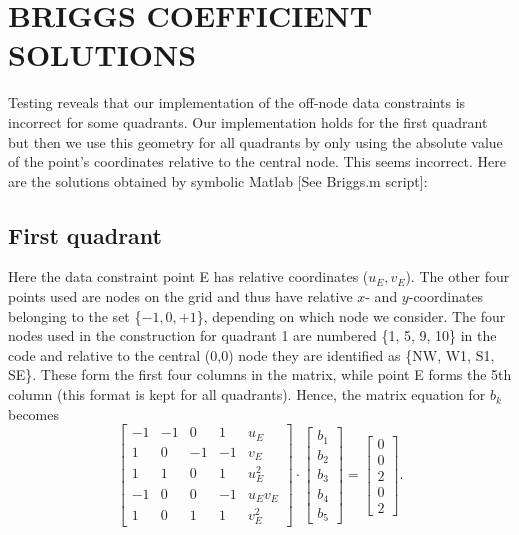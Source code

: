 \documentclass[12pt,letterpaper,margin=0.5in]{article}
\begin{document}
\section{BRIGGS COEFFICIENT SOLUTIONS}

Testing reveals that our implementation of the off-node data constraints is incorrect
for some quadrants.  Our implementation holds for the first quadrant but then we
use this geometry for all quadrants by only using the absolute value of the point's
coordinates relative to the central node.  This seems incorrect.  Here are the
solutions obtained by symbolic Matlab [See Briggs.m script]:
\subsection{First quadrant}
Here the data constraint point E has relative coordinates ($u_E, v_E$).  The other four points used are
nodes on the grid and thus have relative $x$- and $y$-coordinates belonging to the set \{$-1, 0, +1$\}, depending on
which node we consider. The four nodes used in the
construction for quadrant 1 are numbered \{1, 5, 9, 10\} in the code and relative to the central (0,0) node they
are identified as \{NW, W1, S1, SE\}. These form the first four columns in the matrix, while point E
forms the 5th column (this format is kept for all quadrants).  Hence, the matrix equation
for $b_k$ becomes
\begin{equation}
\left[ {\begin{array}{*{20}{r}}
{ - 1}&{ - 1}&0&1&{{u_E}}\\
1&0&{ - 1}&{ - 1}&{{v_E}}\\
1&1&0&1&{u_E^2}\\
{ - 1}&0&0&{ - 1}&{{u_E}{v_E}}\\
1&0&1&1&{v_E^2}
\end{array}} \right] \cdot \left[ {\begin{array}{*{20}{c}}
{{b_1}}\\
{{b_2}}\\
{{b_3}}\\
{{b_4}}\\
{{b_5}}
\end{array}} \right] = \left[ {\begin{array}{*{20}{c}}
0\\
0\\
2\\
0\\
2
\end{array}} \right].
\end{equation}
\end{document}
